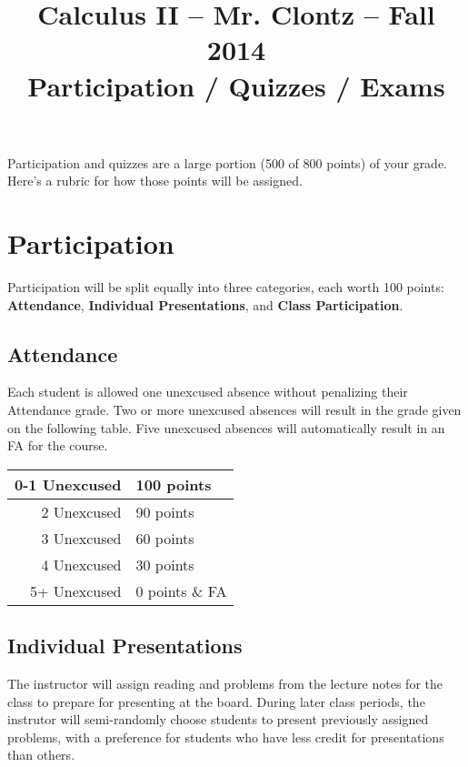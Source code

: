 \documentclass[11pt]{article}
\begin{document}
\title{
  Calculus II -- Mr. Clontz -- Fall 2014 \\
  Participation / Quizzes / Exams
}

\maketitle

Participation and quizzes are a large portion (500 of 800 points) of your
grade. Here's a rubric for how those points will be assigned.

\section{Participation}

Participation will be split equally into three categories, each worth 100
points: \textbf{Attendance}, \textbf{Individual Presentations}, and
\textbf{Class Participation}.

\subsection{Attendance}

Each student is allowed one unexcused absence without penalizing their
Attendance grade. Two or more unexcused absences will result in the grade given
on the following table. Five unexcused absences will automatically result in an
FA for the course.

\begin{center}
\begin{tabular}{rl}
0-1 Unexcused & 100 points \\\hline
2 Unexcused & 90 points \\\hline
3 Unexcused & 60 points \\\hline
4 Unexcused & 30 points \\\hline
5+ Unexcused & 0 points \& FA
\end{tabular}
\end{center}

\subsection{Individual Presentations}

The instructor will assign reading and problems from the lecture notes for the
class to prepare for presenting at the board. During later class periods,
the instrutor will semi-randomly choose students to present previously
assigned problems, with a preference for students who have less credit for
presentations than others.
\end{document}
